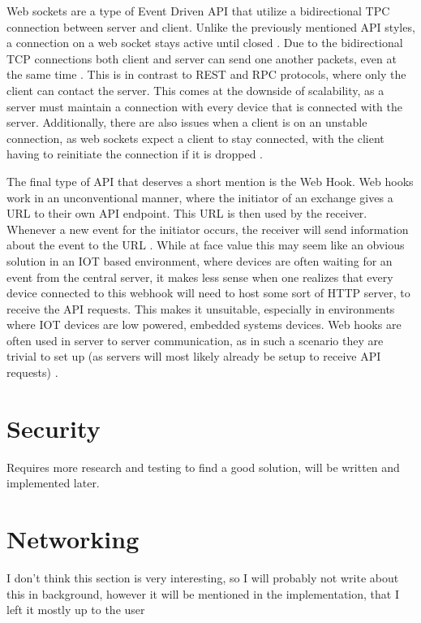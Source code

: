 Web sockets are a type of Event Driven API that utilize a bidirectional TPC connection between server and client. Unlike the previously mentioned API styles, a connection on a web socket stays active until closed \cite{WebsocketStandard}. Due to the bidirectional TCP connections both client and server can send one another packets, even at the same time \cite{DesigningWebApis}. This is in contrast to REST and RPC protocols, where only the client can contact the server. This comes at the downside of scalability, as a server must maintain a connection with every device that is connected with the server. Additionally, there are also issues when a client is on an unstable connection, as web sockets expect a client to stay connected, with the client having to reinitiate the connection if it is dropped \cite{DesigningWebApis}.

The final type of API that deserves a short mention is the Web Hook. Web hooks work in an unconventional manner, where the initiator of an exchange gives a URL to their own API endpoint. This URL is then used by the receiver. Whenever a new event for the initiator occurs, the receiver will send information about the event to the URL \cite{DesigningWebApis}. While at face value this may seem like an obvious solution in an IOT based environment, where devices are often waiting for an event from the central server, it makes less sense when one realizes that every device connected to this webhook will need to host some sort of HTTP server, to receive the API requests. This makes it unsuitable, especially in environments where IOT devices are low powered, embedded systems devices. Web hooks are often used in server to server communication, as in such a scenario they are trivial to set up (as servers will most likely already be setup to receive API requests) \cite{DesigningWebApis}.

\section{Security} \label{sec:chap2:security}
Requires more research and testing to find a good solution, will be written and implemented later.

\section{Networking} \label{sec:chap2:networking}
I don't think this section is very interesting, so I will probably not write about this in background, however it will be mentioned in the implementation, that I left it mostly up to the user

